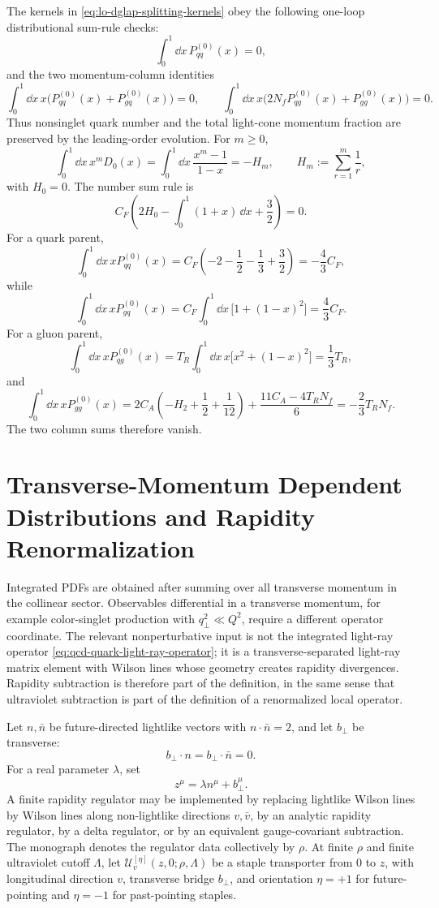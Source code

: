 The kernels in \eqref{eq:lo-dglap-splitting-kernels} obey the following
one-loop distributional sum-rule checks:
\[
  \int_0^1\dd x\,P_{qq}^{(0)}(x)=0,
\]
and the two momentum-column identities
\[
  \int_0^1\dd x\,x
  \bigl(P_{qq}^{(0)}(x)+P_{gq}^{(0)}(x)\bigr)=0,
  \qquad
  \int_0^1\dd x\,x
  \bigl(2N_fP_{qg}^{(0)}(x)+P_{gg}^{(0)}(x)\bigr)=0 .
\]
Thus nonsinglet quark number and the total light-cone momentum fraction are
preserved by the leading-order evolution.
For \(m\ge0\),
\[
  \int_0^1\dd x\,x^mD_0(x)
  =
  \int_0^1\dd x\,\frac{x^m-1}{1-x}
  =
  -H_m,
  \qquad
  H_m:=\sum_{r=1}^m\frac1r ,
\]
with \(H_0=0\).  The number sum rule is
\[
  C_F\left(2H_0-\int_0^1(1+x)\,\dd x+\frac32\right)=0.
\]
For a quark parent,
\[
  \int_0^1\dd x\,xP_{qq}^{(0)}(x)
  =
  C_F\left(-2-\frac12-\frac13+\frac32\right)
  =
  -\frac43C_F,
\]
while
\[
  \int_0^1\dd x\,xP_{gq}^{(0)}(x)
  =
  C_F\int_0^1\dd x\,\bigl[1+(1-x)^2\bigr]
  =
  \frac43C_F .
\]
For a gluon parent,
\[
  \int_0^1\dd x\,xP_{qg}^{(0)}(x)
  =
  T_R\int_0^1\dd x\,x\bigl[x^2+(1-x)^2\bigr]
  =
  \frac13T_R ,
\]
and
\[
  \int_0^1\dd x\,xP_{gg}^{(0)}(x)
  =
  2C_A\left(-H_2+\frac12+\frac1{12}\right)
  +\frac{11C_A-4T_RN_f}{6}
  =
  -\frac23T_RN_f .
\]
The two column sums therefore vanish.

\section{Transverse-Momentum Dependent Distributions and Rapidity Renormalization}
\label{sec:qcd-tmd-rapidity-renormalization}

Integrated PDFs are obtained after summing over all transverse momentum in the
collinear sector.  Observables differential in a transverse momentum, for
example color-singlet production with \(q_\perp^2\ll Q^2\), require a different
operator coordinate.  The relevant nonperturbative input is not the integrated
light-ray operator \eqref{eq:qcd-quark-light-ray-operator}; it is a
transverse-separated light-ray matrix element with Wilson lines whose geometry
creates rapidity divergences.  Rapidity subtraction is therefore part of the
definition, in the same sense that ultraviolet subtraction is part of the
definition of a renormalized local operator.

Let \(n,\bar n\) be future-directed lightlike vectors with
\(n\cdot\bar n=2\), and let \(b_\perp\) be transverse:
\[
  b_\perp\cdot n=b_\perp\cdot\bar n=0 .
\]
For a real parameter \(\lambda\), set
\[
  z^\mu=\lambda n^\mu+b_\perp^\mu .
\]
A finite rapidity regulator may be implemented by replacing lightlike Wilson
lines by Wilson lines along non-lightlike directions \(v,\bar v\), by an
analytic rapidity regulator, by a delta regulator, or by an equivalent
gauge-covariant subtraction.  The monograph denotes the regulator data
collectively by \(\rho\).  At finite \(\rho\) and finite ultraviolet cutoff
\(\Lambda\), let
\(\mathcal U^{[\eta]}_{v}(z,0;\rho,\Lambda)\) be a staple transporter from
\(0\) to \(z\), with longitudinal direction \(v\), transverse bridge
\(b_\perp\), and orientation \(\eta=+1\) for future-pointing and
\(\eta=-1\) for past-pointing staples.

